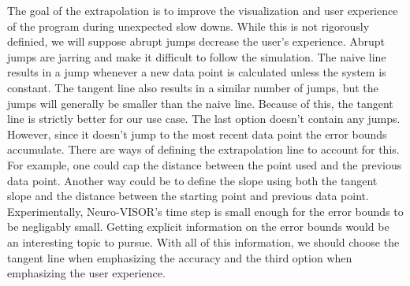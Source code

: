 The goal of the extrapolation is to improve the visualization and user experience of the program during unexpected slow downs.
While this is not rigorously definied, we will suppose abrupt jumps decrease the user's experience.
Abrupt jumps are jarring and make it difficult to follow the simulation.
The naive line results in a jump whenever a new data point is calculated unless the system is constant.
The tangent line also results in a similar number of jumps, but the jumps will generally be smaller than the naive line.
Because of this, the tangent line is strictly better for our use case.
The last option doesn't contain any jumps.
However, since it doesn't jump to the most recent data point the error bounds accumulate.
There are ways of defining the extrapolation line to account for this.
For example, one could cap the distance between the point used and the previous data point.
Another way could be to define the slope using both the tangent slope and the distance between the starting point and previous data point.
Experimentally, Neuro-VISOR's time step is small enough for the error bounds to be negligably small.
Getting explicit information on the error bounds would be an interesting topic to pursue.
With all of this information, we should choose the tangent line when emphasizing the accuracy and the third option when emphasizing the user experience.
